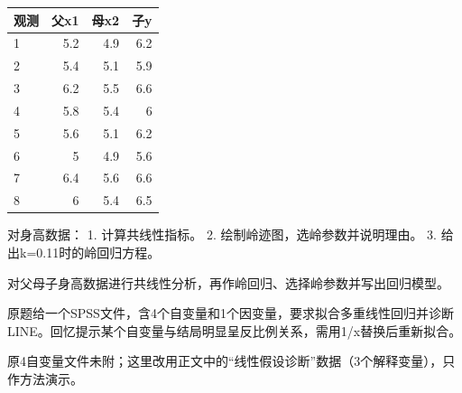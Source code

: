 \begin{center}\small\setlength{\tabcolsep}{3.5pt}\renewcommand{\arraystretch}{1.18}\begin{tabular}{@{}lrrr@{}}
\toprule
观测 & 父x1 & 母x2 & 子y \\
\midrule

1 & 5.2 & 4.9 & 6.2 \\
2 & 5.4 & 5.1 & 5.9 \\
3 & 6.2 & 5.5 & 6.6 \\
4 & 5.8 & 5.4 & 6 \\
5 & 5.6 & 5.1 & 6.2 \\
6 & 5 & 4.9 & 5.6 \\
7 & 6.4 & 5.6 & 6.6 \\
8 & 6 & 5.4 & 6.5 \\
\bottomrule\end{tabular}\end{center}


\par\addvspace{6pt}\noindent\begin{minipage}{\linewidth}


对身高数据： 1. 计算共线性指标。 2. 绘制岭迹图，选岭参数并说明理由。 3. 给出k=0.11时的岭回归方程。



\end{minipage}\par\vspace{4pt}

\par\addvspace{6pt}\noindent\begin{minipage}{\linewidth}


对父母子身高数据进行共线性分析，再作岭回归、选择岭参数并写出回归模型。



\end{minipage}\par\vspace{4pt}

\par\addvspace{6pt}\noindent\begin{minipage}{\linewidth}


原题给一个SPSS文件，含4个自变量和1个因变量，要求拟合多重线性回归并诊断LINE。回忆提示某个自变量与结局明显呈反比例关系，需用1/x替换后重新拟合。

原4自变量文件未附；这里改用正文中的``线性假设诊断''数据（3个解释变量），只作方法演示。



\end{minipage}\par\vspace{4pt}

